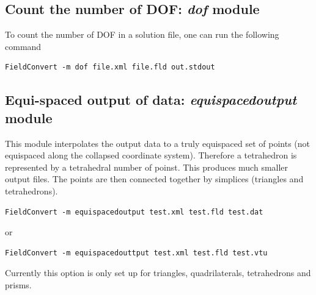 \subsection{Count the number of DOF: \textit{dof} module}
To count the number of DOF in a solution file,
one can run the following command
%
\begin{lstlisting}[style=BashInputStyle]
FieldConvert -m dof file.xml file.fld out.stdout
\end{lstlisting}
%
%
%
\subsection{Equi-spaced output of data: \textit{equispacedoutput} module}
This module interpolates the output data to a truly equispaced set of
points (not equispaced along the collapsed coordinate
system). Therefore a tetrahedron is represented by a tetrahedral
number of poinst. This produces much smaller output files. The points
are then connected together by simplices (triangles and tetrahedrons).

\begin{lstlisting}[style=BashInputStyle]
FieldConvert -m equispacedoutput test.xml test.fld test.dat
\end{lstlisting}

or

\begin{lstlisting}[style=BashInputStyle]
FieldConvert -m equispacedouttput test.xml test.fld test.vtu
\end{lstlisting}


\begin{notebox}
Currently this option is only set up for triangles, quadrilaterals,
tetrahedrons and prisms.
\end{notebox}

